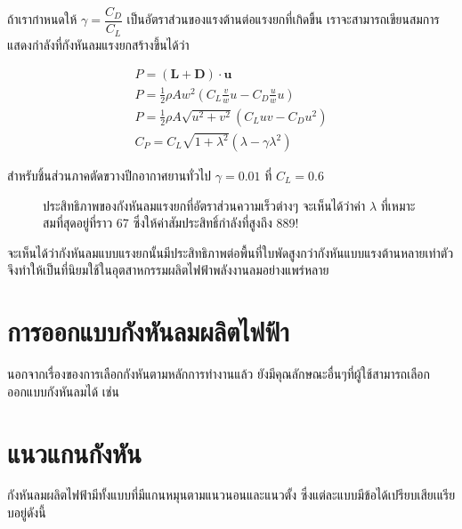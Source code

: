 \documentclass[a4paper,nobib,openany,10pt]{tufte-book}
\begin{document}
ถ้าเรากำหนดให้ \(\gamma = \dfrac{C_D}{C_L}\)
เป็นอัตราส่วนของแรงต้านต่อแรงยกที่เกิดขึ้น
เราจะสามารถเขียนสมการแสดงกำลังที่กังหันลมแรงยกสร้างขึ้นได้ว่า

\[\begin{gathered}
  P = (\mathbf{L} + \mathbf{D}) \cdot \mathbf{u} \nonumber \\
  P = \frac{1}{2}\rho A w^2 (C_L \frac{v}{w} u - C_D \frac{u}{w}u) \nonumber \\
  P = \frac{1}{2}\rho A \sqrt{u^2 + v^2} \left( C_L u v - C_D u^2 \right) \nonumber \\
  C_P = C_L \sqrt{1+\lambda^2} \left( \lambda - \gamma \lambda^2 \right) \end{gathered}\]

สำหรับชิ้นส่วนภาคตัดขวางปีกอากาศยานทั่วไป \(\gamma =  0.01\) ที่
\(C_L = 0.6\)

\begin{figure}[h]
\caption{\label{fig:power coeff lift-based turbine}ประสิทธิภาพของกังหันลมแรงยกที่อัตราส่วนความเร็วต่างๆ จะเห็นได้ว่าค่า \(\lambda\) ที่เหมาะสมที่สุดอยู่ที่ราว 67 ซึ่งให้ค่าสัมประสิทธิ์กำลังที่สูงถึง 889!}
\end{figure}

จะเห็นได้ว่ากังหันลมแบบแรงยกนั้นมีประสิทธิภาพต่อพื้นที่ใบพัดสูงกว่ากังหันแบบแรงต้านหลายเท่าตัว
จึงทำให้เป็นที่นิยมใช้ในอุตสาหกรรมผลิตไฟฟ้าพลังงานลมอย่างแพร่หลาย

\section{การออกแบบกังหันลมผลิตไฟฟ้า}
\label{sec:org9cc15ec}
นอกจากเรื่องของการเลือกกังหันตามหลักการทำงานแล้ว
ยังมีคุณลักษณะอื่นๆที่ผู้ใช้สามารถเลือกออกแบบกังหันลมได้ เช่น

\section{แนวแกนกังหัน}
\label{sec:orgec8fa43}
กังหันลมผลิตไฟฟ้ามีทั้งแบบที่มีแกนหมุนตามแนวนอนและแนวตั้ง
ซึ่งแต่ละแบบมีข้อได้เปรียบเสียเแรียบอยู่ดังนี้
\end{document}

